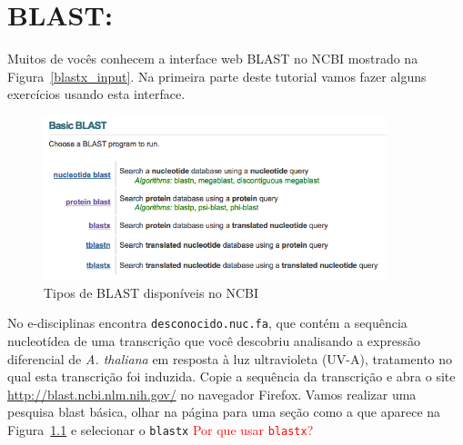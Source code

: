 \documentclass[letter,11pt]{book}
\begin{document}
%
%
%
%

\chapter{BLAST: }

Muitos de vocês conhecem a interface web BLAST no NCBI mostrado na Figura~\ref{blastx_input}.  Na primeira parte deste tutorial vamos fazer alguns exercícios usando esta interface.

\begin{figure}[h!]
\centering
   \includegraphics[width=10cm]{Figs/blasthomepage.png}
  \caption{\label{blasthomepage}Tipos de BLAST disponíveis no NCBI}
\end{figure}

No e-disciplinas encontra \Verb+desconocido.nuc.fa+, que contém a sequência nucleotídea de uma transcrição que você descobriu analisando a expressão diferencial de \textit{A. thaliana} em resposta à luz ultravioleta (UV-A), tratamento no qual esta transcrição foi induzida. Copie a sequência da transcrição e abra o site \url{http://blast.ncbi.nlm.nih.gov/} no navegador Firefox. Vamos realizar uma pesquisa blast básica, olhar na página para uma seção como a que aparece na Figura~\ref{blasthomepage} e selecionar o \Verb+blastx+\textcolor{red}{{\textquestiondown} Por que usar \Verb+blastx+?}
\end{document}
